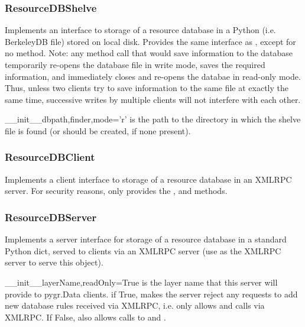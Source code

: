 \documentclass{howto}
\begin{document}
\subsubsection{ResourceDBShelve}
Implements an interface to storage of a resource database in a Python
 (i.e. BerkeleyDB file) stored on local disk.
Provides the same interface as , except for
no  method.  Note: any method call that would
save information to the database temporarily re-opens the database
file in write mode, saves the required information, and immediately
closes and re-opens
the databae in read-only mode.  Thus, unless two clients try
to save information to the same file at exactly the same time,
successive writes by multiple clients will not interfere with each
other.
\begin{funcdesc}{__init__}{dbpath,finder,mode='r'}
   is the path to the directory in which the shelve
  file is found (or should be created, if none present).
\end{funcdesc}

\subsubsection{ResourceDBClient}
Implements a client interface to storage of a resource database in an XMLRPC
server.  For security reasons, only provides the ,
and  methods.

\subsubsection{ResourceDBServer}
Implements a server interface for storage of a resource database in 
a standard Python dict, served to clients via an XMLRPC
server (use  as the XMLRPC
server to serve this object).  

\begin{funcdesc}{__init__}{layerName,readOnly=True}
   is the layer name that this server will provide
  to pygr.Data clients.   if True, makes the server reject
  any requests to add new database rules received via XMLRPC, i.e.
  only allows  and  calls via XMLRPC.
  If False, also allows calls to  and .
\end{funcdesc}
\end{document}
